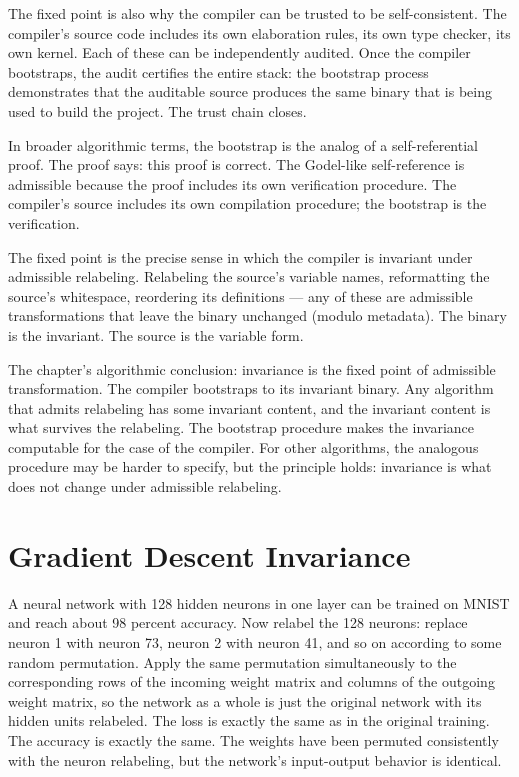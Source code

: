The fixed point is also why the compiler can be trusted to be
self-consistent. The compiler's source code includes its own
elaboration rules, its own type checker, its own kernel. Each of
these can be independently audited. Once the compiler bootstraps,
the audit certifies the entire stack: the bootstrap process
demonstrates that the auditable source produces the same binary
that is being used to build the project. The trust chain
closes.

In broader algorithmic terms, the bootstrap is the analog of a
self-referential proof. The proof says: this proof is correct.
The Godel-like self-reference is admissible because the proof
includes its own verification procedure. The compiler's source
includes its own compilation procedure; the bootstrap is the
verification.

The fixed point is the precise sense in which the compiler is
invariant under admissible relabeling. Relabeling the source's
variable names, reformatting the source's whitespace, reordering
its definitions --- any of these are admissible transformations
that leave the binary unchanged (modulo metadata). The binary
is the invariant. The source is the variable form.

The chapter's algorithmic conclusion: invariance is the fixed
point of admissible transformation. The compiler bootstraps to
its invariant binary. Any algorithm that admits relabeling has
some invariant content, and the invariant content is what
survives the relabeling. The bootstrap procedure makes the
invariance computable for the case of the compiler. For other
algorithms, the analogous procedure may be harder to specify,
but the principle holds: invariance is what does not change
under admissible relabeling.

\section{Gradient Descent Invariance}
\label{se:gradient-descent-invariance}

A neural network with 128 hidden neurons in one layer can be trained
on MNIST and reach about 98 percent accuracy. Now relabel the 128
neurons: replace neuron 1 with neuron 73, neuron 2 with neuron 41,
and so on according to some random permutation. Apply the same
permutation simultaneously to the corresponding rows of the
incoming weight matrix and columns of the outgoing weight matrix,
so the network as a whole is just the original network with its
hidden units relabeled. The loss is exactly the same as in the
original training. The accuracy is exactly the same. The weights
have been permuted consistently with the neuron relabeling, but
the network's input-output behavior is identical.

